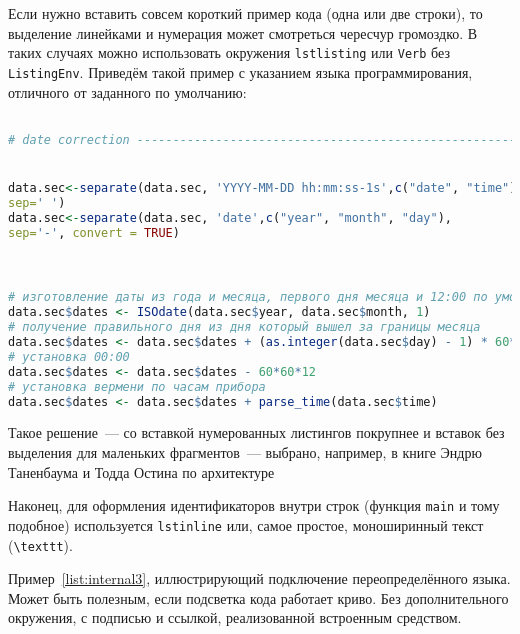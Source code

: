Если нужно вставить совсем короткий пример кода (одна или две строки), то выделение  линейками и нумерация может смотреться чересчур громоздко. В таких случаях можно использовать окружения \texttt{lstlisting} или \texttt{Verb} без \texttt{ListingEnv}. Приведём такой пример с указанием языка программирования, отличного от заданного по умолчанию:
\begin{lstlisting}[language=R]

# date correction ---------------------------------------------------------


data.sec<-separate(data.sec, 'YYYY-MM-DD hh:mm:ss-1s',c("date", "time"),
sep=' ')
data.sec<-separate(data.sec, 'date',c("year", "month", "day"),
sep='-', convert = TRUE)



# изготовление даты из года и месяца, первого дня месяца и 12:00 по умолчанию
data.sec$dates <- ISOdate(data.sec$year, data.sec$month, 1)
# получение правильного дня из дня который вышел за границы месяца
data.sec$dates <- data.sec$dates + (as.integer(data.sec$day) - 1) * 60*60*24
# установка 00:00  
data.sec$dates <- data.sec$dates - 60*60*12 
# установка вермени по часам прибора
data.sec$dates <- data.sec$dates + parse_time(data.sec$time)

\end{lstlisting}
Такое решение~--- со вставкой нумерованных листингов покрупнее
и вставок без выделения для маленьких фрагментов~--- выбрано,
например, в книге Эндрю Таненбаума и Тодда Остина по архитектуре

Наконец, для оформления идентификаторов внутри строк
(функция \lstinline{main} и тому подобное) используется
\texttt{lstinline} или, самое простое, моноширинный текст
(\texttt{\textbackslash texttt}).


Пример~\ref{list:internal3}, иллюстрирующий подключение переопределённого языка. Может быть полезным, если подсветка кода работает криво. Без дополнительного окружения, с подписью и ссылкой, реализованной встроенным средством.

\begin{lstlisting}[language={Renhanced},caption={Листинг восстановления метки даты в секундных массивах},label={list:internal3}]

\end{lstlisting}
%
%    






